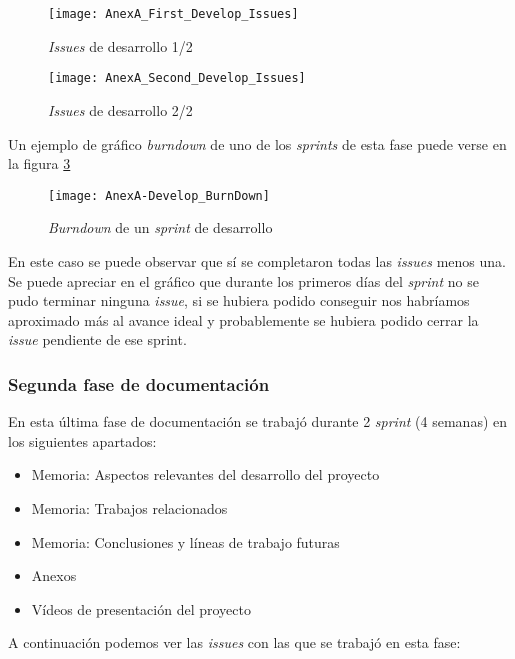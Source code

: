 \begin{figure}[!h]
	\centering
	\texttt{[image: AnexA\_First\_Develop\_Issues]}
	\caption{\textit{Issues} de desarrollo 1/2}
	\label{fig:AnexA_First_Develop_Issues}
\end{figure}
\FloatBarrier

\begin{figure}[!h]
	\centering
	\texttt{[image: AnexA\_Second\_Develop\_Issues]}
	\caption{\textit{Issues} de desarrollo 2/2}
	\label{fig:AnexA_Second_Develop_Issues}
\end{figure}
\FloatBarrier

Un ejemplo de gráfico \textit{burndown} de uno de los \textit{sprints} de esta fase puede verse en la figura \ref{fig:AnexA-Develop_BurnDown}

\begin{figure}[!h]
	\centering
	\texttt{[image: AnexA-Develop\_BurnDown]}
	\caption{\textit{Burndown} de un \textit{sprint} de desarrollo}
	\label{fig:AnexA-Develop_BurnDown}
\end{figure}
\FloatBarrier

En este caso se puede observar que sí se completaron todas las \textit{issues} menos una. Se puede apreciar en el gráfico que durante los primeros días del \textit{sprint} no se pudo terminar ninguna \textit{issue}, si se hubiera podido conseguir nos habríamos aproximado más al avance ideal y probablemente se hubiera podido cerrar la \textit{issue} pendiente de ese sprint.

\subsubsection{Segunda fase de documentación}
En esta última fase de documentación se trabajó durante 2 \textit{sprint} (4 semanas) en los siguientes apartados:

\begin{itemize}
	\item Memoria: Aspectos relevantes del desarrollo del proyecto
	\item Memoria: Trabajos relacionados
	\item Memoria: Conclusiones y líneas de trabajo futuras
	\item Anexos
	\item Vídeos de presentación del proyecto
\end{itemize}

A continuación podemos ver las \textit{issues} con las que se trabajó en esta fase:


